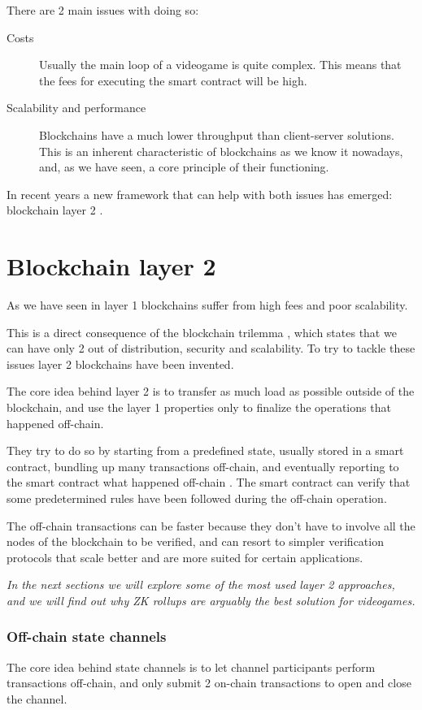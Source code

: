 \documentclass[12pt]{article}
\begin{document}
There are 2 main issues with doing so:
\begin{description}
    \item[Costs] Usually the main loop of a videogame is quite complex. This means that the fees for executing the smart contract will be high.
    \item[Scalability and performance] Blockchains have a much lower throughput than client-server solutions. This is an inherent characteristic of blockchains as we know it nowadays, and, as we have seen, a core principle of their functioning.
\end{description}

In recent years a new framework that can help with both issues has emerged: blockchain layer 2 \cite{ethereum_scaling}.

\newpage
\part{Blockchain layer 2} \label{part:bl2}
As we have seen in  layer 1 blockchains suffer from high fees and poor scalability.

This is a direct consequence of the blockchain trilemma \cite{blockchain_trilemma}, which states that we can have only 2 out of distribution, security and scalability.
To try to tackle these issues layer 2 blockchains have been invented.

The core idea behind layer 2 is to transfer as much load as possible outside of the blockchain, and use the layer 1 properties only to finalize the operations that happened off-chain.

They try to do so by starting from a predefined state, usually stored in a smart contract, bundling up many transactions off-chain, and eventually reporting to the smart contract what happened off-chain \cite{ethereum_layer2}.
The smart contract can verify that some predetermined rules have been followed during the off-chain operation. 

The off-chain transactions can be faster because they don't have to involve all the nodes of the blockchain to be verified, and can resort to simpler verification protocols that scale better and are more suited for certain applications.

\emph{In the next sections we will explore some of the most used layer 2 approaches, and we will find out why ZK rollups are arguably the best solution for videogames.}

\section{Off-chain state channels} \label{section:ocsc}
The core idea behind state channels is to let channel participants perform transactions off-chain, and only submit 2 on-chain transactions to open and close the channel.
\end{document}
